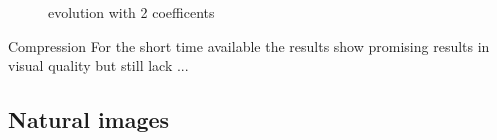 \begin{figure}[H]
\centering
{}
\hspace{5mm}
\caption{evolution with 2 coefficents}
\label{fig:coeffsOMPsamples}
\end{figure}


Compression
For the short time available the results show promising results in visual
quality but still lack ...


\subsection{Natural images}

